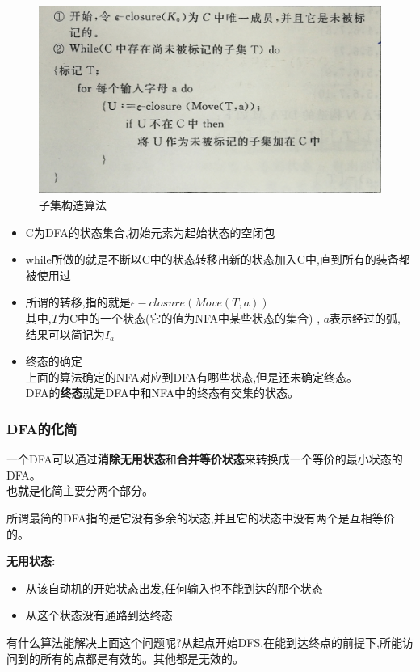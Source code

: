 \documentclass[UTF8,a4paper]{ctexart}
\newcommand{\spaceline}{\vspace{\baselineskip}}
\begin{document}
  \begin{figure}[H]
    \centering
    \includegraphics[scale = 0.1]{assets/CompilerConstructionPrinciples_763bd.png}
    \caption{子集构造算法}
    \label{fig-zijifa}
  \end{figure}

  \begin{itemize}
    \item C为DFA的状态集合,初始元素为起始状态的空闭包
    \item while所做的就是不断以C中的状态转移出新的状态加入C中,直到所有的装备都被使用过
    \item 所谓的转移,指的就是$\epsilon-closure(Move(T,a))$\\
    其中,$T$为C中的一个状态(它的值为NFA中某些状态的集合) , $a$表示经过的弧, 结果可以简记为$I_a$
    \item 终态的确定\\
    上面的算法确定的NFA对应到DFA有哪些状态,但是还未确定终态。\\
    DFA的\textbf{终态}就是DFA中和NFA中的终态有交集的状态。
  \end{itemize}

  \subsubsection{DFA的化简}
  一个DFA可以通过\textbf{消除无用状态}和\textbf{合并等价状态}来转换成一个等价的最小状态的DFA。\\
  也就是化简主要分两个部分。

  \spaceline
  所谓最简的DFA指的是它没有多余的状态,并且它的状态中没有两个是互相等价的。

  \spaceline
  \textbf{无用状态:}
  \begin{itemize}
    \item 从该自动机的开始状态出发,任何输入也不能到达的那个状态
    \item 从这个状态没有通路到达终态
  \end{itemize}
  {\color{blue}有什么算法能解决上面这个问题呢?从起点开始DFS,在能到达终点的前提下,所能访问到的所有的点都是有效的。其他都是无效的。}
\end{document}
